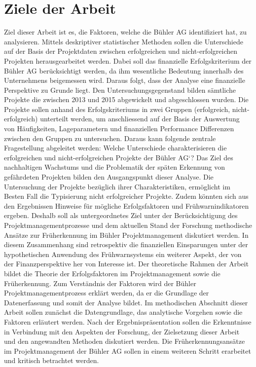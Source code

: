 \section{Ziele der Arbeit}\label{sec:zda}
Ziel dieser Arbeit ist es, die Faktoren, welche die Bühler AG identifiziert hat, zu analysieren. Mittels deskriptiver statistischer Methoden sollen die Unterschiede auf der Basis der Projektdaten zwischen erfolgreichen und nicht-erfolgreichen Projekten herausgearbeitet werden. Dabei soll das finanzielle Erfolgskriterium der Bühler AG berücksichtigt werden, da ihm wesentliche Bedeutung innerhalb des Unternehmens beigemessen wird. Daraus folgt, dass der Analyse eine finanzielle Perspektive zu Grunde liegt. Den Untersuchungsgegenstand bilden sämtliche Projekte die zwischen 2013 und 2015 abgewickelt und abgeschlossen wurden. Die Projekte sollen anhand des Erfolgskriteriums in zwei Gruppen (erfolgreich, nicht-erfolgreich) unterteilt  werden, um anschliessend auf der Basis der Auswertung von  Häufigkeiten, Lageparametern und finanziellen Performance Differenzen zwischen den Gruppen zu untersuchen. Daraus kann folgende zentrale Fragestellung abgeleitet werden: 
\newline\newline
Welche Unterschiede charakterisieren die erfolgreichen und nicht-erfolgreichen Projekte der Bühler AG`?
\newline\newline
Das Ziel des nachhaltigen Wachstums und die Problematik der späten Erkennung von gefährdeten Projekten bilden den Ausgangspunkt dieser Analyse. Die Untersuchung der Projekte bezüglich ihrer Charakteristiken, ermöglicht im Besten Fall die Typisierung nicht erfolgreicher Projekte. Zudem könnten sich aus den Ergebnissen Hinweise für mögliche Erfolgsfaktoren und Frühwarnindikatoren ergeben. Deshalb soll als untergeordnetes Ziel unter der Berücksichtigung des Projektmanagementprozesse und dem aktuellen Stand der Forschung methodische Ansätze zur Früherkennung im Bühler Projektmanagement diskutiert werden. In diesem Zusammenhang sind retrospektiv die finanziellen Einsparungen unter der hypothetischen Anwendung des Frühwarnsystems ein weiterer Aspekt, der von der Finanzperspektive her von Interesse ist. 
\newline\newline
Der theoretische Rahmen der Arbeit bildet die Theorie der Erfolgsfaktoren im Projektmanagement sowie die Früherkennung. Zum Verständnis der Faktoren wird der Bühler Projektmanagementprozess erklärt werden, da er die Grundlage der Datenerfassung und somit der Analyse bildet. Im methodischen Abschnitt dieser Arbeit sollen zunächst die Datengrundlage, das analytische Vorgehen sowie die Faktoren erläutert werden. Nach der Ergebnispräsentation sollen die Erkenntnisse in Verbindung mit den Aspekten der Forschung, der Zielsetzung dieser Arbeit und den angewandten Methoden diskutiert werden. Die Früherkennungsansätze im Projektmanagement der Bühler AG sollen in einem weiteren Schritt erarbeitet und kritisch betrachtet werden.
